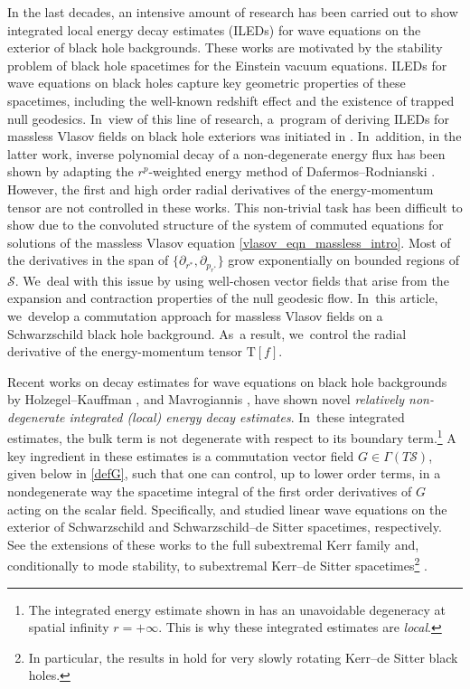 \documentclass[JEP,XML,SOM,Unicode,published]{cedram}
\theoremstyle{plain}
\theoremstyle{definition}
\begin{document}
In the last decades, an intensive amount of research \cite{DR09, BS03, AB, TT11, DRSR, Aret11, Mos16, MS24} has been carried out to show integrated local energy decay estimates (ILEDs) for wave equations on the exterior of black hole backgrounds. These works are motivated by the stability problem of black hole spacetimes for the Einstein vacuum equations. ILEDs for wave equations on black holes capture key geometric properties of these spacetimes, including the well-known redshift effect and the existence of trapped null geodesics. In~view of this line of research, a~program of deriving ILEDs for massless Vlasov fields on black hole exteriors was initiated in \cite{ABJ,L23}. In~addition, in the latter work, inverse polynomial decay of a non-degenerate energy flux has been shown by adapting the $r^p$-weighted energy method of Dafermos--Rodnianski \cite{DR10}. However, the first and high order radial derivatives of the energy-momentum tensor are not controlled in these works. This non-trivial task has been difficult to show due to the convoluted structure of the system of commuted equations for solutions of the massless Vlasov equation \eqref{vlasov_eqn_massless_intro}. Most of the derivatives in the span of $\{\partial_{r^*}, \partial_{p_{r^*}}\}$ grow exponentially on bounded regions of $\mathcal{S}$. We~deal with this issue by using well-chosen vector fields that arise from the expansion and contraction properties of the null geodesic flow. In~this article, we~develop a commutation approach for massless Vlasov fields on a Schwarzschild black hole background. As~a result, we~control the radial derivative of the energy-momentum tensor $\mathrm{T}[f]$.

Recent works on decay estimates for wave equations on black hole backgrounds by Holzegel--Kauffman \cite{GK23}, and Mavrogiannis \cite{Mavr23}, have shown novel \emph{relatively non-degenerate integrated (local) energy decay estimates}. In~these integrated estimates, the bulk term is not degenerate with respect to its boundary term.\footnote{The integrated energy estimate shown in \cite{GK23} has an unavoidable degeneracy at spatial infinity $r=+\infty$. This is why these integrated estimates are \textit{local}.} A key ingredient in these estimates is a commutation vector field $G \in \Gamma (T\mathcal{S})$, given below in \eqref{defG}, such that one can control, up to lower order terms, in a nondegenerate way the spacetime integral of the first order derivatives of $G$ acting on the scalar field. Specifically, \cite{GK23} and \cite{Mavr23} studied linear wave equations on the exterior of Schwarzschild and Schwarzschild--de Sitter spacetimes, respectively. See the extensions of these works to the full subextremal Kerr family \cite{HKa23} and, conditionally to mode stability, to subextremal Kerr--de Sitter spacetimes\footnote{In particular, the results in \cite{mavrogiannis_2022} hold for very slowly rotating Kerr--de Sitter black holes.} \cite{mavrogiannis_2022}.
\end{document}
